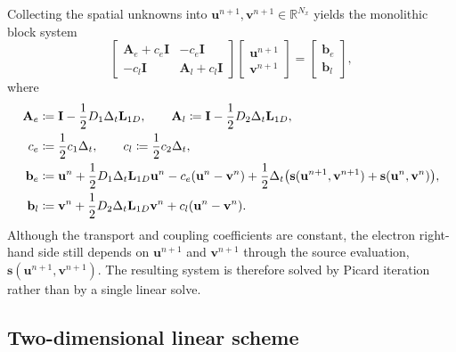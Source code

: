 Collecting the spatial unknowns into $\mathbf{u}^{n+1}, \mathbf{v}^{n+1} \in \mathbb{R}^{N_x}$ yields the monolithic block system
\begin{equation}
    \begin{bmatrix}
        \mathbf{A}_e + c_e \mathbf{I} & -c_e \mathbf{I}               \\
        -c_l \mathbf{I}               & \mathbf{A}_l + c_l \mathbf{I}
    \end{bmatrix}
    \begin{bmatrix}
        \mathbf{u}^{n+1} \\
        \mathbf{v}^{n+1}
    \end{bmatrix}
    =
    \begin{bmatrix}
        \mathbf{b}_e \\
        \mathbf{b}_l
    \end{bmatrix},
    \label{eq:ch2-block-1d}
\end{equation}
where
\begin{align}
    \mathbf{A}_e
     & \coloneqq \mathbf{I} - \frac{1}{2} D_1 \Delta_t \mathbf{L}_{1D}, \qquad
    \mathbf{A}_l \coloneqq \mathbf{I} - \frac{1}{2} D_2 \Delta_t \mathbf{L}_{1D}, \notag \\
    c_e
     & \coloneqq \frac{1}{2} c_1 \Delta_t, \qquad
    c_l \coloneqq \frac{1}{2} c_2 \Delta_t, \notag                                       \\
    \mathbf{b}_e
     & \coloneqq
    \mathbf{u}^n
    + \frac{1}{2} D_1 \Delta_t \mathbf{L}_{1D}\mathbf{u}^n
    - c_e(\mathbf{u}^n - \mathbf{v}^n)
    + \frac{1}{2} \Delta_t
    \bigl(
    \mathbf{s}(\mathbf{u}^{n+1}, \mathbf{v}^{n+1})
    +
    \mathbf{s}(\mathbf{u}^n, \mathbf{v}^n)
    \bigr), \notag                                                                       \\
    \mathbf{b}_l
     & \coloneqq
    \mathbf{v}^n
    + \frac{1}{2} D_2 \Delta_t \mathbf{L}_{1D}\mathbf{v}^n
    + c_l(\mathbf{u}^n - \mathbf{v}^n). \notag
\end{align}
Although the transport and coupling coefficients are constant, the electron right-hand side still depends on $\mathbf{u}^{n+1}$ and $\mathbf{v}^{n+1}$ through the source evaluation, $\mathbf{s}(\mathbf{u}^{n+1}, \mathbf{v}^{n+1})$.
The resulting system is therefore solved by Picard iteration rather than by a single linear solve.

\subsection{Two-dimensional linear scheme}
\label{sec:ch2-linear-2d}

